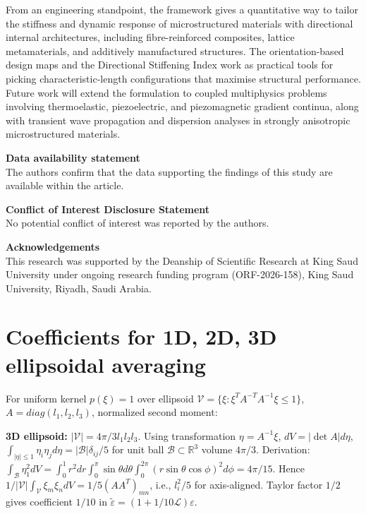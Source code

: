\documentclass[final,3p,times,fleqn]{elsarticle}
\begin{document}
From an engineering standpoint, the framework gives a quantitative way
to tailor the stiffness and dynamic response of microstructured
materials with directional internal architectures, including
fibre-reinforced composites, lattice metamaterials, and additively
manufactured structures. The orientation-based design maps and the
Directional Stiffening Index work as practical tools for picking
characteristic-length configurations that maximise structural
performance. Future work will extend the formulation to coupled
multiphysics problems involving thermoelastic, piezoelectric, and
piezomagnetic gradient continua, along with transient wave propagation
and dispersion analyses in strongly anisotropic microstructured
materials.

\vspace{.4cm}
\noindent\textbf{\large{Data availability statement}}\\
The authors confirm that the data supporting the findings of this study
are available within the article.
\vspace{.4cm}

\noindent\textbf{\large{Conflict of Interest Disclosure Statement}}\\
No potential conflict of interest was reported by the authors.
\vspace{.4cm}

\noindent\textbf{\large{Acknowledgements}}\\
This research was supported by the Deanship of Scientific Research at King Saud University under ongoing research funding program (ORF-2026-158), King Saud University, Riyadh, Saudi Arabia.


\appendix
\section{Coefficients for 1D, 2D, 3D ellipsoidal averaging}
\label{app:coeffs}
For uniform kernel $p(\xi)=1$ over ellipsoid $\mathcal{V}=\{\xi: \xi^T A^{-T}A^{-1}\xi\le1\}$, $A=diag(l_1,l_2,l_3)$, normalized second moment:

\textbf{3D ellipsoid:} $|\mathcal{V}|=4\pi/3 l_1l_2l_3$. Using transformation $\eta=A^{-1}\xi$, $dV=|\det A|d\eta$, $\int_{|\eta|\le1}\eta_i\eta_j d\eta = |\mathcal{B}|\delta_{ij}/5$ for unit ball $\mathcal{B}\subset\mathbb{R}^3$ volume $4\pi/3$. Derivation: $\int_{\mathcal{B}} \eta_1^2 dV = \int_0^1 r^2 dr \int_0^\pi \sin\theta d\theta \int_0^{2\pi} (r\sin\theta\cos\phi)^2 d\phi = 4\pi/15$. Hence $1/|\mathcal{V}|\int_{\mathcal{V}}\xi_m\xi_n dV = 1/5 (AA^T)_{mn}$, i.e., $l_i^2/5$ for axis-aligned. Taylor factor $1/2$ gives coefficient $1/10$ in $\tilde{\varepsilon}=(1+1/10\mathcal{L})\varepsilon$.
\end{document}
